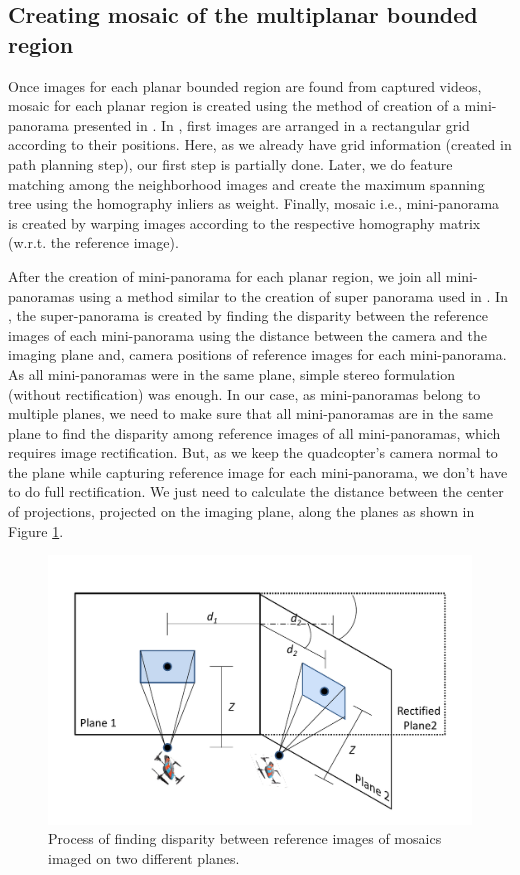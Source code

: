 \subsection{Creating mosaic of the multiplanar bounded region}
Once images for each planar bounded region are found from captured
videos, mosaic for each planar region is created using the method of creation of
a mini-panorama presented in \cite{Prasad16}. In \cite{Prasad16}, first images
are arranged in a rectangular grid according to their positions. Here, as we already have grid
information (created in path planning step), our first step is partially done.
Later, we do feature matching among the neighborhood images and create the
maximum spanning tree using  the homography inliers as weight. Finally, mosaic
i.e., mini-panorama is created by warping images according to the respective
homography matrix (w.r.t. the  reference image).

After the creation of mini-panorama for each planar region, we join all
mini-panoramas using a method similar to the creation of super panorama used in
\cite{Prasad16}. In \cite{Prasad16}, the super-panorama is created by finding the
disparity between the reference images of each mini-panorama using the distance
between the camera and the imaging plane and, camera positions of reference
images for each mini-panorama. As all mini-panoramas were in the same plane,
simple stereo formulation (without rectification) was enough. In our case, as
mini-panoramas belong to multiple planes, we need to make sure that all
mini-panoramas are in the same plane to find the disparity among reference images of
 all mini-panoramas, which requires image rectification. But, as we keep the
 quadcopter's camera normal to the plane while capturing reference image for each
 mini-panorama, we don't have to do full rectification.
 We just need to calculate the distance between the center of projections, projected on the imaging plane, 
 along the planes as shown in Figure \ref{fig:multiplanarMosaic}.

\begin{figure}[ht!]
\centering
\includegraphics[width=\linewidth]{figures/multiplanar/MultiplanarMosaic}
\caption[Super panorama for multiplanar scene]{Process of finding disparity
between reference images of mosaics imaged on two different planes.}
\label{fig:multiplanarMosaic}
\end{figure}

